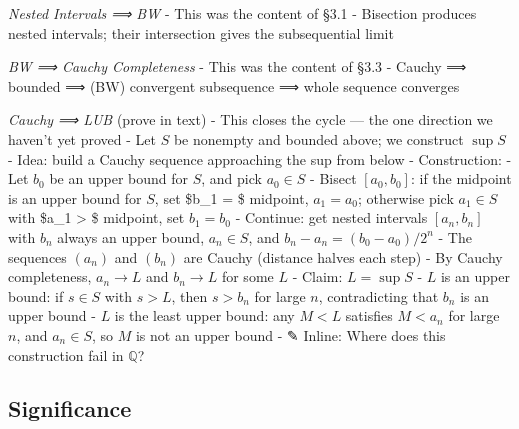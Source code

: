 \documentclass[
  10pt,
  letterpaper,
]{scrbook}
\newcommand{\QQ}{\mathbb{Q}}
\begin{document}
\emph{Nested Intervals ⟹ BW} - This was the content of §3.1 - Bisection
produces nested intervals; their intersection gives the subsequential
limit

\emph{BW ⟹ Cauchy Completeness} - This was the content of §3.3 - Cauchy
⟹ bounded ⟹ (BW) convergent subsequence ⟹ whole sequence converges

\emph{Cauchy ⟹ LUB} (prove in text) - This closes the cycle --- the one
direction we haven't yet proved - Let \(S\) be nonempty and bounded
above; we construct \(\sup S\) - Idea: build a Cauchy sequence
approaching the sup from below - Construction: - Let \(b_0\) be an upper
bound for \(S\), and pick \(a_0 \in S\) - Bisect \([a_0, b_0]\): if the
midpoint is an upper bound for \(S\), set \$b\_1 = \$ midpoint,
\(a_1 = a_0\); otherwise pick \(a_1 \in S\) with \$a\_1 \textgreater{}
\$ midpoint, set \(b_1 = b_0\) - Continue: get nested intervals
\([a_n, b_n]\) with \(b_n\) always an upper bound, \(a_n \in S\), and
\(b_n - a_n = (b_0 - a_0)/2^n\) - The sequences \((a_n)\) and \((b_n)\)
are Cauchy (distance halves each step) - By Cauchy completeness,
\(a_n \to L\) and \(b_n \to L\) for some \(L\) - Claim: \(L = \sup S\) -
\(L\) is an upper bound: if \(s \in S\) with \(s > L\), then \(s > b_n\)
for large \(n\), contradicting that \(b_n\) is an upper bound - \(L\) is
the least upper bound: any \(M < L\) satisfies \(M < a_n\) for large
\(n\), and \(a_n \in S\), so \(M\) is not an upper bound - ✎ Inline:
Where does this construction fail in \(\QQ\)?

\subsection{Significance}\label{significance-1}
\end{document}
